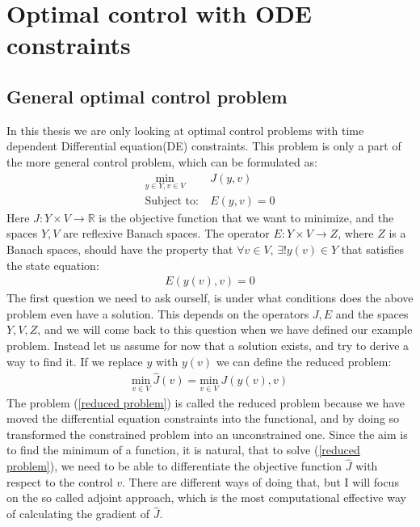 \chapter{Optimal control with ODE constraints}
\section{General optimal control problem}
In this thesis we are only looking at optimal control problems with time dependent Differential equation(DE) constraints. This problem is only a part of the more general control problem, which can be formulated as:
\begin{align}
\underset{y\in Y,v\in V}{\text{min}} \ &J(y,v) \\
\textrm{Subject to:} \ &E(y,v)=0
\end{align}
Here $J: Y\times V\rightarrow\mathbb{R}$ is the objective function that we want to minimize, and the spaces $Y,V$ are reflexive Banach spaces. The operator $E:Y\times V \rightarrow Z$, where $Z$ is a Banach spaces, should have the property that $\forall v \in V$, $\exists! y(v)\in Y$ that satisfies the state equation:
\begin{align*}
E(y(v),v)=0
\end{align*}
The first question we need to ask ourself, is under what conditions does the above problem even have a solution. This depends on the operators $J,E$ and the spaces $Y,V,Z$, and we will come back to this question when we have defined our example problem. Instead let us assume for now that a solution exists, and try to derive a way to find it. If we replace $y$ with $y(v)$ we can define the reduced problem:
\begin{align}
\underset{v\in V}{\text{min}} \ \hat J(v)=\underset{v\in V}{\text{min}} \ J(y(v),v)  \label{reduced problem}
\end{align}
The problem (\ref{reduced problem}) is called the reduced problem because we have moved the differential equation constraints into the functional, and by doing so transformed the constrained problem into an unconstrained one. Since the aim is to find the minimum of a function, it is natural, that to solve (\ref{reduced problem}), we need to be able to differentiate the objective function $\hat{J}$ with respect to the control $v$. There are different ways of doing that, but I will focus on the so called adjoint approach, which is the most computational effective way of calculating the gradient of $\hat{J}$.

